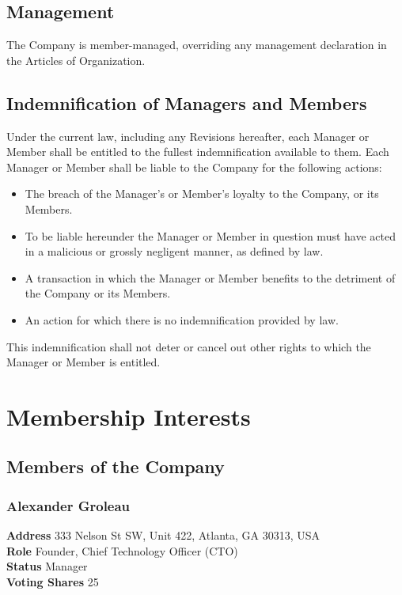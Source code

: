 \documentclass[11pt]{article}
\begin{document}
\subsection{Management}
The Company is member-managed, overriding any management declaration in the Articles of Organization.

\subsection{Indemnification of Managers and Members}
Under the current law, including any Revisions hereafter, each Manager or Member shall be entitled to the fullest indemnification available to them. Each Manager or Member shall be liable to the Company for the following actions:\\
\begin{itemize}
\item The breach of the Manager's or Member's loyalty to the Company, or its Members.
\item To be liable hereunder the Manager or Member in question must have acted in a malicious or grossly negligent manner, as defined by law.
\item A transaction in which the Manager or Member benefits to the detriment of the Company or its Members.
\item An action for which there is no indemnification provided by law.\\
\end{itemize}
This indemnification shall not deter or cancel out other rights to which the Manager or Member is entitled.

\section{Membership Interests}

\subsection{Members of the Company}

\subsubsection{Alexander Groleau}
\textbf{Address} 333 Nelson St SW, Unit 422, Atlanta, GA 30313, USA\\
\textbf{Role} Founder, Chief Technology Officer (CTO)\\
\textbf{Status} Manager \\
\textbf{Voting Shares} 25
\end{document}
